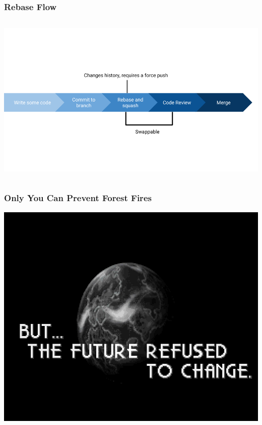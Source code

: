 \documentclass{beamer}
\begin{document}
\begin{frame}
\frametitle{Rebase Flow}
\begin{center}
  \begin{columns}[c]
    \column{\dimexpr\paperwidth+20pt}
    \includegraphics[width=\paperwidth]{pictures/rebase_workflow.png}
    \end{columns}
\end{center}
\end{frame}

\begin{frame}
\frametitle{Only You Can Prevent Forest Fires}
\begin{center}
    \includegraphics[scale=0.2]{pictures/destruction.jpg}
\end{center}
\end{frame}
\end{document}
